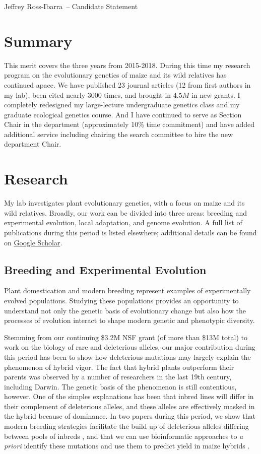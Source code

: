 \documentclass[letterpaper,10pt]{article}
\def\name{Jeffrey Ross-Ibarra}
\begin{document}
{\huge \name\ -- Candidate Statement}

\vspace{0.25in}

\section*{Summary}

This merit covers the three years from 2015-2018. During this time my research program on the evolutionary genetics of maize and its wild relatives has continued apace.
We have published 23 journal articles (12 from first authors in my lab), been cited nearly 3000 times, and brought in $4.5M$ in new grants.
I completely redesigned my large-lecture undergraduate genetics class and my graduate ecological genetics course.
And I have continued to serve as Section Chair in the department (approximately 10\% time commitment) and have added additional service including chairing the search committee to hire the new department Chair.

\section*{Research}

My lab investigates plant evolutionary genetics, with a focus on maize and its wild relatives.
Broadly, our work can be divided into three areas: breeding and experimental evolution, local adaptation, and genome evolution.
A full list of publications during this period is listed elsewhere; additional details can be found on \href{https://scholar.google.com/citations?user=5SzRq1oAAAAJ&hl=en&authuser=1}{Google Scholar}.

\subsection*{Breeding and Experimental Evolution}
Plant domestication and modern breeding represent examples of experimentally evolved populations.
Studying these populations provides an opportunity to understand not only the genetic basis of evolutionary change but also how the processes of evolution interact to shape modern genetic and phenotypic diversity.

Stemming from our continuing \$3.2M NSF grant (of more than \$13M total) to work on the biology of rare and deleterious alleles, our major contribution during this period has been to show how deleterious mutations may largely explain the phenomenon of hybrid vigor.
The fact that hybrid plants outperform their parents was observed by a number of researchers in the last 19th century, including Darwin.
The genetic basis of the phenomenon is still contentious, however.
One of the simples explanations has been that inbred lines will differ in their complement of deleterious alleles, and these alleles are effectively masked in the hybrid because of dominance.
In two papers during this period, we show that modern breeding strategies facilitate the build up of deleterious alleles differing between pools of inbreds \cite{gerke2015genomic}, and that we can use bioinformatic approaches to \textit{a priori} identify these mutations and use them to predict yield in maize hybrids \cite{yang2017incomplete}.
\end{document}
